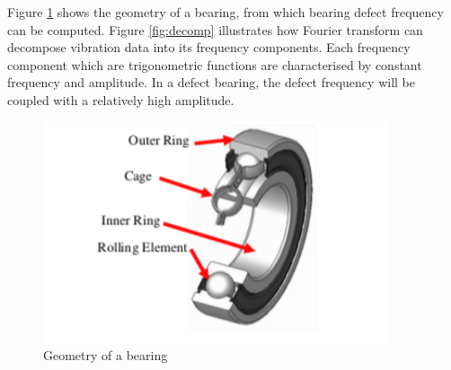 \documentclass[11pt, oneside]{article}   	%
\begin{document}
\begin{flushleft}
Figure \ref{fig:bearing} shows the geometry of a bearing, from which bearing defect frequency can be computed. Figure \ref{fig:decomp}  illustrates how Fourier transform can decompose vibration data into its frequency components. Each frequency component which are trigonometric functions are characterised by constant frequency and amplitude. In a defect bearing, the defect frequency will be coupled with a relatively high amplitude. 
\end{flushleft}
\begin{figure}[H] %
   \centering
   \includegraphics[width=4in]{bearing.png} 
   \caption{Geometry of a bearing}
   \label{fig:bearing}
\end{figure}
\end{document}
